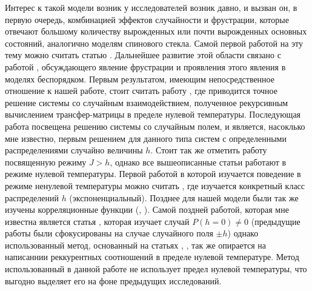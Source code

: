 	Интерес к такой модели возник у исследователей возник давно, и вызван он, в первую очередь, комбинацией эффектов случайности и фрустрации, которые отвечают большому количеству вырожденных или почти вырожденных основных состояний, аналогично моделям спинового стекла. Самой первой работой на эту тему можно считать статью \cite{fan1969one}. Дальнейшее развитие этой области связано с работой \cite{vannimenus1977theory}, обсуждающего явление фрустрации и проявления этого явления в моделях беспорядком. Первым результатом, имеющим непосредственное отношение к нашей работе, стоит считать работу
	\cite{derrida1978simple}, где приводится точное решение системы со случайным взаимодействием, полученное рекурсивным вычислением трансфер-матрицы в пределе нулевой температуры. Последующая работа \cite{PhysRevB.27.4503} посвещена решению системы со случайным полем, и является, насоклько мне известно, первым решением для данного типа систем с определенными распределениями случайно величины $h$. Стоит так же отметить работу \cite{derrida1983singular} посвященную режиму $J>h$, однако все вышеописанные статьи работают в режиме нулевой температуры. Первой работой в которой изучается поведение в режиме ненулевой температуры можно считать \cite{nieuwenhuizen1986exactly}, где изучается конкретный класс распределений $h$ (экспоненциальный). Позднее для нашей модели были так же изучены корреляционные функции (\cite{farhi1993correlation}, \cite{igloi1994correlations}). Самой поздней работой, которая мне известна является статья \cite{hamasaki2004exact}, которая изучает случай $P(h=0) \neq 0$ (предыдущие работы были сфокусированы на случае случайного поля $\pm h$) однако использованный метод, основанный на статьях \cite{dress1995zero}, \cite{kadowaki1996exact}, так же опирается на написаннии реккурентных соотношений в пределе нулевой температуре. Метод использованный в данной работе не использует предел нулевой температуры, что выгодно выделяет его на фоне предыдущих исследований.
	
